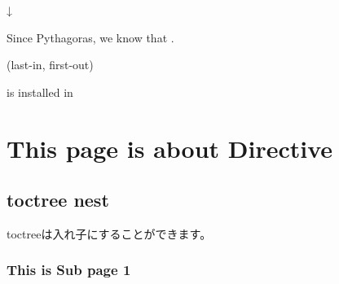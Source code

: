 \documentclass[letterpaper,10pt,dvipdfmx,openany,oneside]{sphinxmanual}
\begin{document}
↓

Since Pythagoras, we know that .

 (last-in, first-out)



is installed in 













\chapter{This page is about Directive}
\label{\detokenize{source/2.chapter/directive::doc}}\label{\detokenize{source/2.chapter/directive:this-page-is-about-directive}}

\section{toctree nest}
\label{\detokenize{source/2.chapter/directive:toctree-nest}}
toctreeは入れ子にすることができます。


\subsection{This is Sub page 1}
\label{\detokenize{source/2.chapter/subpage/sub1:this-is-sub-page-1}}\label{\detokenize{source/2.chapter/subpage/sub1::doc}}
\end{document}
